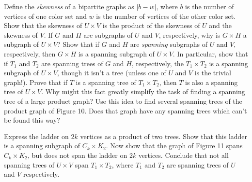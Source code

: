 \documentclass{article}
\begin{document}
\begin{description}
  Define the \emph{skewness} of a bipartite graphs as $|b-w|$, where $b$ is the number of vertices of one color set and $w$ is the number of vertices of the other color set. Show that the skewness of $U \times V$ is the product of the skewness of $U$ and the skewness of $V$. If $G$ and $H$ are subgraphs of $U$ and $V$, respectively, why is $G \times H$ a subgraph of $U \times V$? Show that if $G$ and $H$ are \emph{spanning} subgraphs of $U$ and $V$, respectively, then $G \times H$ is a spanning subgraph of $U \times V$. In particular, show that if $T_1$ and $T_2$ are spanning trees of $G$ and $H$, respectively, the $T_1 \times T_2$ is a spanning subgraph of $U \times V$, though it isn't a tree (unless one of $U$ and $V$ is the trivial graph!). Prove that if $T$ is a spanning tree of $T_1 \times T_2$, then $T$ is also a spanning tree of $U \times V$. Why might this fact greatly simplify the task of finding a spanning tree of a large product graph? Use this idea to find several spanning trees of the product graph of Figure 10. Does that graph have any spanning trees which can't be found this way?

\item[16.] Express the ladder on $2k$ vertices as a product of two trees. Show that this ladder is a spanning subgraph of $C_k \times K_2$. Now show that the graph of Figure 11 spans $C_k \times K_2$, but does not span the ladder on $2k$ vertices. Conclude that not all spanning trees of $U \times V$ span $T_1 \times T_2$, where $T_1$ and $T_2$ are spanning trees of $U$ and $V$ respectively.


\end{description}
\end{document}
